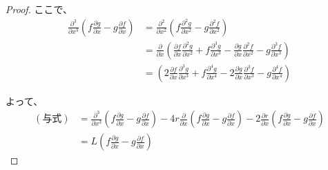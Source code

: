 \documentclass[paper=a4, fontsize=11pt]{jlreq} %
\theoremstyle{break}
\theoremstyle{qa}
\begin{document}
\begin{proof}
ここで、
\begin{align*}
    \frac{\partial^3}{\partial x^3} \left( f\frac{\partial g}{\partial x} - g\frac{\partial f}{\partial x} \right) &= \frac{\partial^2}{\partial x^2} \left( f\frac{\partial^2 g}{\partial x^2} - g\frac{\partial^2 f}{\partial x^2} \right) \\
    &= \frac{\partial}{\partial x} \left( \frac{\partial f}{\partial x}\frac{\partial^2 g}{\partial x^2} + f\frac{\partial^3 g}{\partial x^3} - \frac{\partial g}{\partial x}\frac{\partial^2 f}{\partial x^2} - g\frac{\partial^3 f}{\partial x^3} \right) \\
    &= \left( 2\frac{\partial f}{\partial x}\frac{\partial^3 g}{\partial x^3} + f\frac{\partial^4 g}{\partial x^4} - 2\frac{\partial g}{\partial x}\frac{\partial^3 f}{\partial x^3} - g\frac{\partial^4 f}{\partial x^4} \right)
\end{align*}

よって、
\begin{align*}
    (\text{与式}) &= \frac{\partial^3}{\partial x^3} \left( f\frac{\partial g}{\partial x} - g\frac{\partial f}{\partial x} \right) - 4r \frac{\partial}{\partial x} \left( f\frac{\partial g}{\partial x} - g\frac{\partial f}{\partial x} \right) - 2\frac{\partial r}{\partial x} \left( f\frac{\partial g}{\partial x} - g\frac{\partial f}{\partial x} \right) \\
    &= L \left( f\frac{\partial g}{\partial x} - g\frac{\partial f}{\partial x} \right)
\end{align*}
\end{proof}
\end{document}
